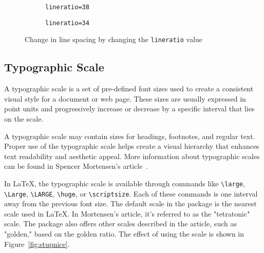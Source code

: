 \documentclass{ltugboat}
\begin{document}
\begin{figure}[tbp]
  \begin{subfigure}[b]{0.45\textwidth}
\caption{\texttt{lineratio=38}}
\end{subfigure}
\begin{subfigure}[b]{0.45\textwidth}
\caption{\texttt{lineratio=34}}
\end{subfigure}
  \caption{Change in line spacing by changing the \texttt{lineratio} value}\label{fig:lineratio}
\end{figure}

\subsection{Typographic Scale}

A typographic scale is a set of pre-defined font sizes used to create a consistent visual style for a document or web page. These sizes are usually expressed in point units and progressively increase or decrease by a specific interval that lies on the scale.

A typographic scale may contain sizes for headings, footnotes, and regular text. Proper use of the typographic scale helps create a visual hierarchy that enhances text readability and aesthetic appeal. More information about typographic scales can be found in Spencer Mortensen's article~\cite{mortensen}.

In \LaTeX, the typographic scale is available through commands like \verb|\large|, \verb|\Large|, \verb|\LARGE|, \verb|\huge|, or \verb|\scriptsize|. Each of these commands is one interval away from the previous font size. The default scale in the  package is the nearest scale used in \LaTeX. In Mortensen's article, it's referred to as the "tetratonic" scale. The package also offers other scales described in the article, such as "golden," based on the golden ratio. The effect of using the scale is shown in Figure~\ref{fig:stupnice}.
\end{document}
